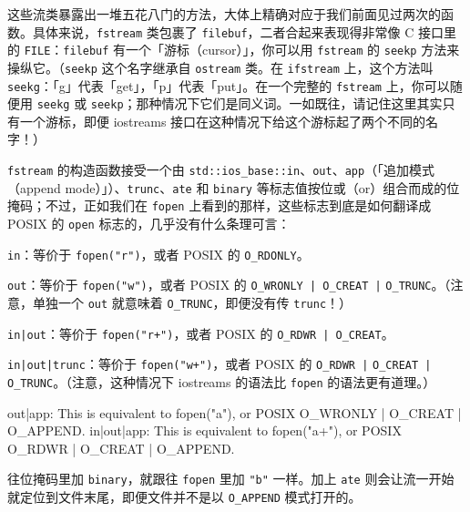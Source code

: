 
这些流类暴露出一堆五花八门的方法，大体上精确对应于我们前面见过两次的函数。具体来说，\texttt{fstream} 类包裹了 \texttt{filebuf}，二者合起来表现得非常像 C 接口里的 \texttt{FILE}：\texttt{filebuf} 有一个「游标（cursor）」，你可以用 \texttt{fstream} 的 \texttt{seekp} 方法来操纵它。（\texttt{seekp} 这个名字继承自 \texttt{ostream} 类。在 \texttt{ifstream} 上，这个方法叫 \texttt{seekg}：「g」代表「get」，「p」代表「put」。在一个完整的 \texttt{fstream} 上，你可以随便用 \texttt{seekg} 或 \texttt{seekp}；那种情况下它们是同义词。一如既往，请记住这里其实只有一个游标，即便 iostreams 接口在这种情况下给这个游标起了两个不同的名字！）

\texttt{fstream} 的构造函数接受一个由 \texttt{std::\allowbreak{}ios\_\allowbreak{}base::\allowbreak{}in}、\texttt{out}、\texttt{app}（「追加模式（append mode）」）、\texttt{trunc}、\texttt{ate} 和 \texttt{binary} 等标志值按位或（or）组合而成的位掩码；不过，正如我们在 \texttt{fopen} 上看到的那样，这些标志到底是如何翻译成 POSIX 的 \texttt{open} 标志的，几乎没有什么条理可言：

\texttt{in}：等价于 \texttt{fopen(\allowbreak{}"r")\allowbreak{}}，或者 POSIX 的 \texttt{O\_\allowbreak{}RDONLY}。

\texttt{out}：等价于 \texttt{fopen(\allowbreak{}"w")\allowbreak{}}，或者 POSIX 的 \texttt{O\_\allowbreak{}WRONLY | O\_\allowbreak{}CREAT |} \texttt{O\_\allowbreak{}TRUNC}。（注意，单独一个 \texttt{out} 就意味着 \texttt{O\_\allowbreak{}TRUNC}，即便没有传 \texttt{trunc}！）

\texttt{in|out}：等价于 \texttt{fopen(\allowbreak{}"r+")\allowbreak{}}，或者 POSIX 的 \texttt{O\_\allowbreak{}RDWR | O\_\allowbreak{}CREAT}。

\texttt{in|out|trunc}：等价于 \texttt{fopen(\allowbreak{}"w+")\allowbreak{}}，或者 POSIX 的 \texttt{O\_\allowbreak{}RDWR |} \texttt{O\_\allowbreak{}CREAT | O\_\allowbreak{}TRUNC}。（注意，这种情况下 iostreams 的语法比 \texttt{fopen} 的语法更有道理。）

\begin{codebox}[cpp]
out|app: This is equivalent to fopen("a"), or POSIX O_WRONLY | O_CREAT |
O_APPEND.
in|out|app: This is equivalent to fopen("a+"), or POSIX O_RDWR | O_CREAT
| O_APPEND.
\end{codebox}

往位掩码里加 \texttt{binary}，就跟往 \texttt{fopen} 里加 \texttt{"b"} 一样。加上 \texttt{ate} 则会让流一开始就定位到文件末尾，即便文件并不是以 \texttt{O\_\allowbreak{}APPEND} 模式打开的。

